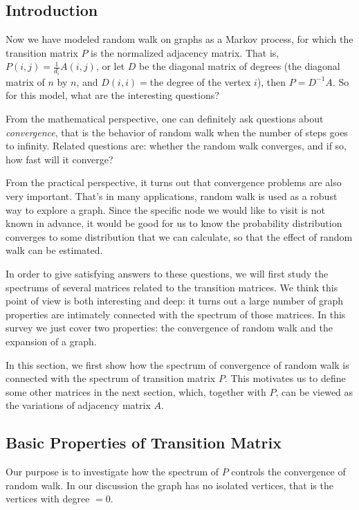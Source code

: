 \subsection{Introduction} Now we have modeled random walk on graphs
as a Markov process, for which the transition matrix $P$ is the
normalized adjacency matrix. That is, $P(i, j)=\frac{1}{d_i} A(i,
j)$, or let $D$ be the diagonal matrix of degrees (the diagonal
matrix of $n$ by $n$, and $D(i, i)=$the degree of the vertex $i$),
then $P=D^{-1}A$. So for this model, what are the interesting
questions?

From the mathematical perspective, one can definitely ask questions
about \emph{convergence}, that is the behavior of random walk when
the number of steps goes to infinity. Related questions are: whether
the random walk converges, and if so, how fast will it converge?

From the practical perspective, it turns out that convergence
problems are also very important. That's in many applications, random walk is used as
a robust way to explore a graph. Since the specific node we would like to visit is not known in
advance, it would be good for us to know the probability distribution converges
to some distribution that we can calculate, so that the
effect of random walk can be estimated.

In order to give satisfying answers to these questions, we will
first study the spectrums of several matrices related to the
transition matrices. We think this point of view is both interesting
and deep: it turns out a large number of graph properties are intimately
connected with the spectrum of those matrices. In this survey we just cover
two properties: the convergence of random walk and the expansion of a graph.

In this section, we first show how
the spectrum of convergence of random walk is connected with the spectrum of
transition matrix $P$. This motivates us to define some other matrices in the next section,
which, together with $P$, can be viewed as the variations of adjacency matrix $A$.

\subsection{Basic Properties of Transition Matrix}

Our purpose is to investigate how the spectrum of $P$ controls the
convergence of random walk. In our discussion the graph has no
isolated vertices, that is the vertices with degree $=0$.

